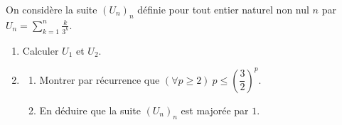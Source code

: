 \fin
{}
On considère la suite $(U_n)_n$ définie pour tout entier naturel non nul $n$ par $U_n=\displaystyle\sum_{k=1}^{n}\frac{k}{3^k}$.
\begin{enumerate}
\item Calculer $U_1$ et $U_2$.
\item \begin{enumerate}
\item Montrer par récurrence que $(\forall p\geq2)\ p\leq\left(\dfrac32\right)^p$.
\item En déduire que la suite $(U_n)_n$ est majorée par $1$.
\end{enumerate}
\end{enumerate}
\fin
